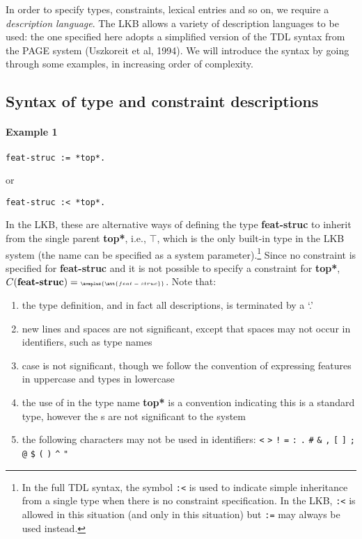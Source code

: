 \documentclass[12pt]{report}
\begin{document}
In order to specify types, constraints, lexical entries and so on, we require
a {\it description language}.
The LKB allows a variety of description languages to be used: the one
specified here adopts a simplified version of the TDL syntax from the PAGE
system (Uszkoreit et al, 1994).
We will introduce the syntax by
going through some examples, in increasing order of complexity.

\subsection{Syntax of type and constraint descriptions}
\label{typesyntax}

\paragraph{Example 1}

\begin{verbatim}
feat-struc := *top*.
\end{verbatim}
or
\begin{verbatim}
feat-struc :< *top*.
\end{verbatim}
In the LKB, these are alternative ways of defining 
the type {\bf feat-struc} to inherit from the single
parent {\bf *top*}, i.e., $\top$,
which is the only built-in type 
in the LKB system (the name can be specified as a 
system parameter).\footnote{In the full 
TDL syntax, the symbol {\tt :<} is 
used to indicate simple inheritance
from a single type when there is no constraint specification.
In the LKB, {\tt :<} is allowed in this situation (and only in this situation)
but {\tt :=} may always be used instead.}
Since no constraint is specified for {\bf feat-struc} and it is
not possible to specify a constraint for {\bf *top*},
$C(\mbox{\bf feat-struc})= \mbox{\tiny $\avmplus{\att{feat-struc}}$}$.
Note that:
\begin{enumerate}
\item the type 
definition, and in fact all descriptions,  is terminated by a `.'
\item new lines and spaces are not significant, except that spaces
may not occur in identifiers, such as type names
\item case is not significant, though we follow the
convention of expressing features in uppercase and types in lowercase
\item the use of {\tt *} in the type name {\bf *top*} is a convention
indicating this is a standard type, however the {\tt *}s are not significant
to the system
\item  the following characters may not be used in identifiers:
{\tt <} {\tt >} {\tt !} {\tt =} {\tt :} 
{\tt .} {\tt \#} {\tt \&} {\tt ,} {\tt [}
{\tt ]} {\tt ;} {\tt @} {\tt \$} {\tt (} {\tt )} {\tt \verb+^+} {\tt "}
\end{enumerate}
\end{document}
